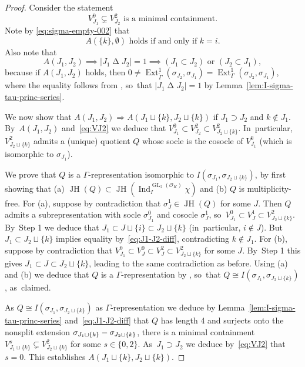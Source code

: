 \documentclass[JEP,XML,SOM,Unicode,NoFloatCountersInSection, NoEqCountersInSection,published]{cedram}
\let\wt\widetilde
\newcommand{\cO}{\mathcal{O}}
\DeclareMathOperator{\Ext}{Ext}
\DeclareMathOperator{\GL}{GL}
\DeclareMathOperator{\Ind}{Ind}
\DeclareMathOperator{\JH}{\mathrm{JH}}
\theoremstyle{plain}
\theoremstyle{definition}
\begin{document}
\begin{proof}
Consider the statement
\begin{equation*}
\tag*{$A(J_1,J_2)$} V_{J_1}^0 \subsetneq V_{J_2}^2 \text{\ is a minimal containment}.
\end{equation*}
Note by \eqref{eq:sigma-empty-002} that
\begin{equation}\label{eq:Ak-empty}
\text{$A(\{k\},\emptyset)$ holds if and only if $k = i$.}
\end{equation}
Also note that
\begin{equation}\label{eq:J1-J2-diff}
A(J_1,J_2) \implies |J_1 \mathbin\Delta J_2| = 1 \implies (J_1 \subset J_2) \text{\ or\ } (J_2 \subset J_1),
\end{equation}
because if $A(J_1,J_2)$ holds, then $0\neq \Ext^1_{\wt\Gamma}(\sigma_{J_2},\sigma_{J_1})=\Ext^1_{\Gamma}(\sigma_{J_2},\sigma_{J_1})$, where the equality follows from \cite[Cor.\,5.6(ii)]{BP}, so~that $|J_1 \mathbin\Delta J_2| = 1$ by Lemma~\ref{lem:I-sigma-tau-princ-series}.

We now show that $A(J_1,J_2) \Rightarrow A(J_1 \sqcup \{k\},J_2 \sqcup \{k\})$ if $J_1 \supset J_2$ and $k \notin J_1$. By~$A(J_1,J_2)$ and~\eqref{eq:VJ2} we deduce that $V_{J_1}^0 \subset V_{J_2}^2 \subset V_{J_2 \sqcup \{k\}}^2$. In~particular, $V_{J_2 \sqcup \{k\}}^2$ admits a (unique) quotient $Q$ {whose socle is the cosocle of $V_{J_1}^0$ (which is isomorphic to $\sigma_{J_1}$).}

We prove that $Q$ is a $\Gamma$-representation isomorphic to $I(\sigma_{J_1},\sigma_{J_2 \sqcup \{k\}})$, by first showing that (a) $\JH(Q) \subset \JH(\Ind_I^{\GL_2(\cO_K)} \chi)$ and (b) $Q$ is multiplicity-free.
For (a), suppose by contradiction that $\sigma_J^1 \in \JH(Q)$ for some $J$. Then $Q$ admits a subrepresentation with socle $\sigma_{J_1}^0$ and cosocle $\sigma_J^1$, so~$V_{J_1}^0 \subset V_J^1 \subset V_{J_2 \sqcup \{k\}}^2$. By~Step 1 we deduce that $J_1 \subset J \sqcup \{i\} \subset J_2 \sqcup \{k\}$ (in~particular, $i \notin J$).
But $J_1 \subset J_2 \sqcup \{k\}$ implies equality by~\eqref{eq:J1-J2-diff}, contradicting $k\notin J_1$.
For (b), suppose by contradiction that $V_{J_1}^0 \subset V_J^0 \subset V_J^2 \subset V_{J_2 \sqcup \{k\}}^2$ for some $J$. By~Step 1 this gives $J_1 \subset J \subset J_2 \sqcup \{k\}$, leading to the same contradiction as before.
Using (a) and (b) we deduce that $Q$ is a $\Gamma$-representation by \cite[Cor.\,5.7]{BP}, so~that $Q \cong I(\sigma_{J_1},\sigma_{J_2 \sqcup \{k\}})$, as~claimed.

As $Q \cong I(\sigma_{J_1},\sigma_{J_2 \sqcup \{k\}})$ as $\Gamma$-representation we deduce by Lemma~\ref{lem:I-sigma-tau-princ-series} and~\eqref{eq:J1-J2-diff} that $Q$ has length 4 and surjects onto the nonsplit extension $\sigma_{J_1 \sqcup \{k\}} \-- \sigma_{J_2 \sqcup \{k\}}$, \ie there is a minimal containment $V_{J_1 \sqcup \{k\}}^s \subsetneq V_{J_2 \sqcup \{k\}}^2$ for some $s \in \{0,2\}$. As~$J_1 \supset J_2$ we deduce by~\eqref{eq:VJ2} that $s = 0$.
This establishes $A(J_1 \sqcup \{k\},J_2 \sqcup \{k\})$.


\end{proof}
\end{document}
